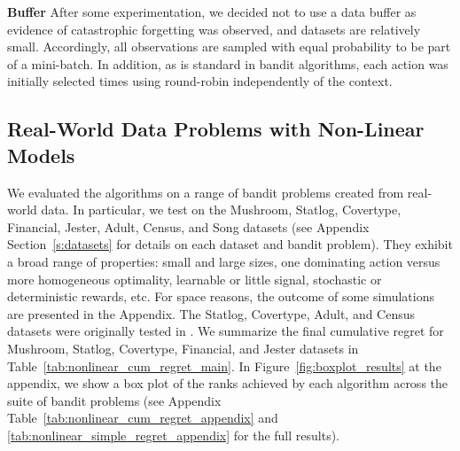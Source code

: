 \documentclass{article} \usepackage{iclr2018_conference,times}
\begin{document}
\textbf{Buffer} After some experimentation, we decided not to use a data buffer as evidence of catastrophic forgetting was observed, and datasets are relatively small.
Accordingly, all observations are sampled with equal probability to be part of a mini-batch.
In addition, as is standard in bandit algorithms, each action was initially selected  times using round-robin independently of the context.

\subsection{Real-World Data Problems with Non-Linear Models} 
We evaluated the algorithms on a range of bandit problems created from real-world data. In particular, we test on the Mushroom, Statlog, Covertype, Financial, Jester, Adult, Census, and Song datasets (see Appendix Section~\ref{s:datasets} for details on each dataset and bandit problem). They exhibit a broad range of properties: small and large sizes, one dominating action versus more homogeneous optimality, learnable or little signal, stochastic or deterministic rewards, etc. 
For space reasons, the outcome of some simulations are presented in the Appendix.
The Statlog, Covertype, Adult, and Census datasets were originally tested in \cite{elmachtoub2017practical}. We summarize the final cumulative regret for Mushroom, Statlog, Covertype, Financial, and Jester datasets in Table~\ref{tab:nonlinear_cum_regret_main}.  In Figure~\ref{fig:boxplot_results} at the appendix, we show a box plot of the ranks achieved by each algorithm across the suite of bandit problems (see Appendix Table~\ref{tab:nonlinear_cum_regret_appendix} and \ref{tab:nonlinear_simple_regret_appendix} for the full results). 
\end{document}
